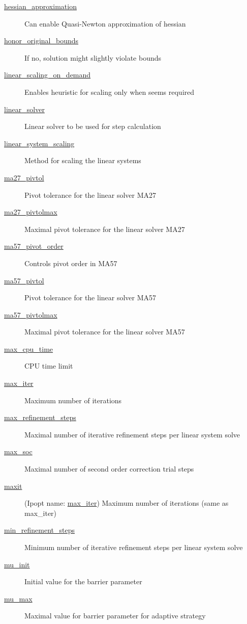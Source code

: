 \begin{description}
\item[{\hyperref[opt:hessian_approximation]{hessian\_approximation}}] Can enable Quasi-Newton approximation of hessian
\item[{\hyperref[opt:honor_original_bounds]{honor\_original\_bounds}}] If no, solution might slightly violate bounds
\item[{\hyperref[opt:linear_scaling_on_demand]{linear\_scaling\_on\_demand}}] Enables heuristic for scaling only when seems required
\item[{\hyperref[opt:linear_solver]{linear\_solver}}] Linear solver to be used for step calculation
\item[{\hyperref[opt:linear_system_scaling]{linear\_system\_scaling}}] Method for scaling the linear systems
\item[{\hyperref[opt:ma27_pivtol]{ma27\_pivtol}}] Pivot tolerance for the linear solver MA27
\item[{\hyperref[opt:ma27_pivtolmax]{ma27\_pivtolmax}}] Maximal pivot tolerance for the linear solver MA27
\item[{\hyperref[opt:ma57_pivot_order]{ma57\_pivot\_order}}] Controls pivot order in MA57
\item[{\hyperref[opt:ma57_pivtol]{ma57\_pivtol}}] Pivot tolerance for the linear solver MA57
\item[{\hyperref[opt:ma57_pivtolmax]{ma57\_pivtolmax}}] Maximal pivot tolerance for the linear solver MA57
\item[{\hyperref[opt:max_cpu_time]{max\_cpu\_time}}] CPU time limit
\item[{\hyperref[opt:max_iter]{max\_iter}}] Maximum number of iterations
\item[{\hyperref[opt:max_refinement_steps]{max\_refinement\_steps}}] Maximal number of iterative refinement steps per linear system solve
\item[{\hyperref[opt:max_soc]{max\_soc}}] Maximal number of second order correction trial steps
\item[{\hyperref[opt:max_iter]{maxit}}] (Ipopt name: \hyperref[opt:max_iter]{max\_iter}) Maximum number of iterations (same as max\_iter)
\item[{\hyperref[opt:min_refinement_steps]{min\_refinement\_steps}}] Minimum number of iterative refinement steps per linear system solve
\item[{\hyperref[opt:mu_init]{mu\_init}}] Initial value for the barrier parameter
\item[{\hyperref[opt:mu_max]{mu\_max}}] Maximal value for barrier parameter for adaptive strategy

\end{description}
